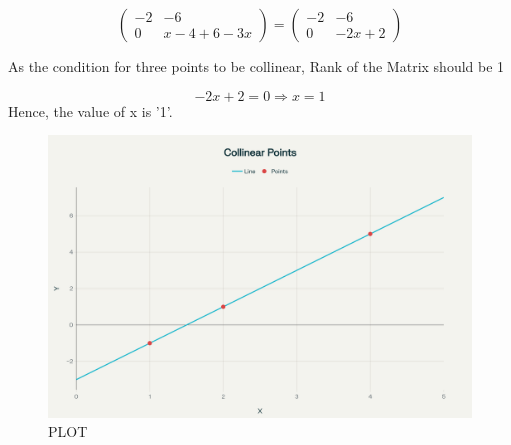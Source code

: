 \documentclass[journal]{IEEEtran}
\begin{document}
\[
\begin{pmatrix}
-2 & -6 \\
0 & x - 4 + 6 - 3x
\end{pmatrix}
=
\begin{pmatrix}
-2 & -6 \\
0 & -2x + 2
\end{pmatrix}
\]

As the condition for three points to be collinear, Rank of the Matrix should be 1

\[
-2x + 2 = 0
\Rightarrow x = 1
\]
Hence, the value of x  is '1'.

\begin{figure}[H]
    \centering
    \includegraphics[width=0.5\linewidth]{Figs/Fig.png}
    \caption{PLOT}
    \label{fig:placeholder}
\end{figure}
\end{document}
